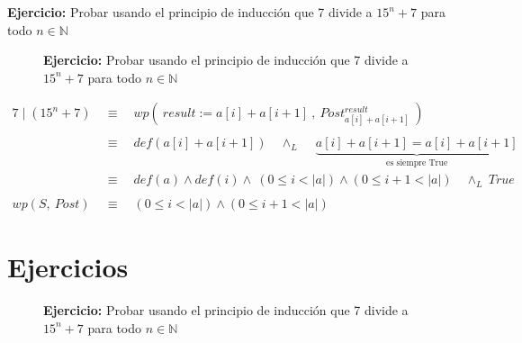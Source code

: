 \documentclass[12pt]{book}
\begin{document}
\begin{shaded}
\textbf{Ejercicio: }
Probar usando el principio de inducción que 7 divide a $ 15^{n} + 7$ para todo $n \in \mathbb N $  
\end{shaded}

\begin{figure}
\vspace{-15pt}
\begin{shaded}
\textbf{Ejercicio: } Probar usando el principio de inducción que 7 divide a $ 15^{n} + 7$ para todo $n \in \mathbb N $  
\end{shaded}
\end{figure}

\begin{equation*}
\begin{split}
7\mid (15^{n} + 7) \  &\equiv \quad wp ( \ result  := a[i] + a[i+1] \ , \ Post^{result}_{a[i] + a[i+1]} \ )  \\ \\
&\equiv  \quad  def( a[i] + a[i+1]) \quad \wedge_{L} \quad \ \underbrace{a[i] + a[i+1] = a[i] + a[i+1]}_{\text{es siempre True}}  \\
&\equiv  \quad  def( a) \wedge def(i) \wedge \ ( 0 \leq i < \vert a \vert ) \wedge (0 \leq i+1 < \vert a \vert ) \quad      \wedge_{L} \ True  \\ \\
wp(S, \ Post) \ &\equiv  \quad  ( 0 \leq i < \vert a \vert ) \wedge (0 \leq i+1 < \vert a \vert )
\end{split}
\end{equation*}




\section{Ejercicios}


\begin{figure}
\vspace{-15pt}
\begin{shaded}
\textbf{Ejercicio: } Probar usando el principio de inducción que 7 divide a $ 15^{n} + 7$ para todo $n \in \mathbb N $  
\end{shaded}
\end{figure}
\end{document}
